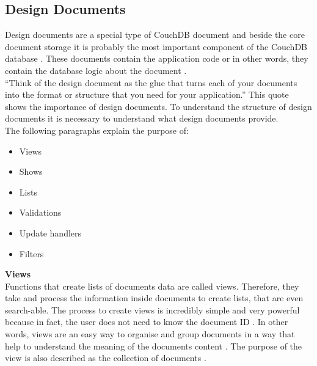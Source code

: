 \subsection{Design Documents}
Design documents are a special type of CouchDB document and beside the core document storage it is probably the most important component of the CouchDB database \cite{CouchDB.Guide,Brown.2012}. These documents contain the application code or in other words, they contain the database logic about the document \cite{CouchDB.Guide,Brown.2012}. \\
``Think of the design document as the glue that turns each of your documents into the format or structure that you need for your application.'' \cite{Brown.2012}
This quote shows the importance of design documents.
To understand the structure of design documents it is necessary to understand what design documents provide. \\
The following paragraphs explain the purpose of: 
\begin{itemize}
    \item Views
    \item Shows
    \item Lists
    \item Validations
    \item Update handlers
    \item Filters
\end{itemize}
\textbf{Views} \\
Functions that create lists of documents data are called views. Therefore, they take and process the information inside documents to create lists, that are even search-able. The process to create views is incredibly simple and very powerful because in fact, the user does not need to know the document ID \cite{Brown.2012}. In other words, views are an easy way to organise and group documents in a way that help to understand the meaning of the documents content \cite{CouchDB.Guide}. The purpose of the view is also described as the collection of documents \cite{Brown.2012}. \\
